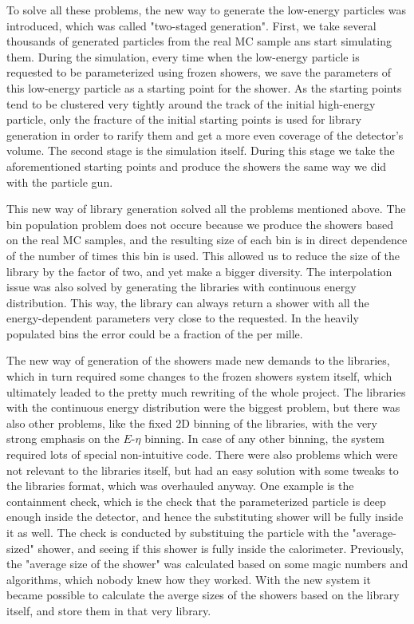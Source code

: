 To solve all these problems, the new way to generate the low-energy particles was introduced, which was called "two-staged generation". First, we take several thousands of generated particles from the real MC sample ans start simulating them. During the simulation, every time when the low-energy particle is requested to be parameterized using frozen showers, we save the parameters of this low-energy particle as a starting point for the shower. As the starting points tend to be clustered very tightly around the track of the initial high-energy particle, only the fracture of the initial starting points is used for library generation in order to rarify them and get a more even coverage of the detector's volume. The second stage is the simulation itself. During this stage we take the aforementioned starting points and produce the showers the same way we did with the particle gun.

This new way of library generation solved all the problems mentioned above. The bin population problem does not occure because we produce the showers based on the real MC samples, and the resulting size of each bin is in direct dependence of the number of times this bin is used. This allowed us to reduce the size of the library by the factor of two, and yet make a bigger diversity. The interpolation issue was also solved by generating the libraries with continuous energy distribution. This way, the library can always return a shower with all the energy-dependent parameters very close to the requested. In the heavily populated bins the error could be a fraction of the per mille.

The new way of generation of the showers made new demands to the libraries, which in turn required some changes to the frozen showers system itself, which ultimately leaded to the pretty much rewriting of the whole project. The libraries with the continuous energy distribution were the biggest problem, but there was also other problems, like the fixed 2D binning of the libraries, with the very strong emphasis on the $E$-$\eta$ binning. In case of any other binning, the system required lots of special non-intuitive code. There were also problems which were not relevant to the libraries itself, but had an easy solution with some tweaks to the libraries format, which was overhauled anyway. One example is the containment check, which is the check that the parameterized particle is deep enough inside the detector, and hence the substituting shower will be fully inside it as well. The check is conducted by substituing the particle with the "average-sized" shower, and seeing if this shower is fully inside the calorimeter. Previously, the "average size of the shower" was calculated based on some magic numbers and algorithms, which nobody knew how they worked. With the new system it became possible to calculate the averge sizes of the showers based on the library itself, and store them in that very library.

